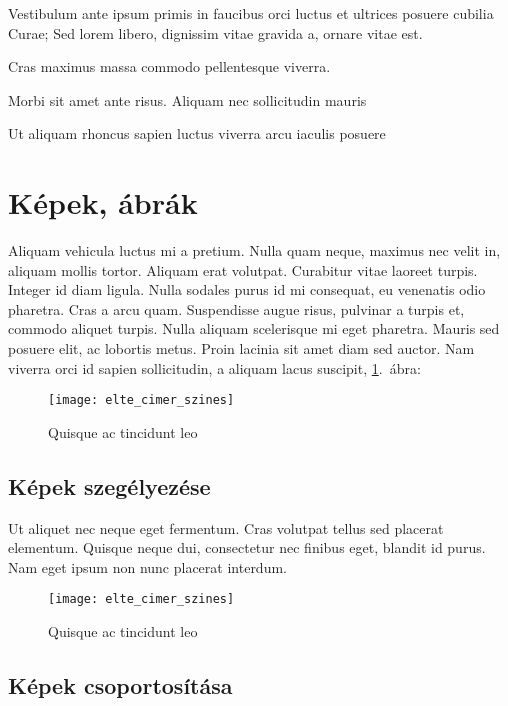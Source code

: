 \bigskip

Vestibulum ante ipsum primis in faucibus orci luctus et ultrices posuere cubilia Curae; Sed lorem libero, dignissim vitae gravida a, ornare vitae est.
\begin{compactdesc}
	\item[Cras maximus] massa commodo pellentesque viverra.
	\item[Morbi sit] amet ante risus. Aliquam nec sollicitudin mauris
	\item[Ut aliquam rhoncus sapien] luctus viverra arcu iaculis posuere
\end{compactdesc}


\section{Képek, ábrák}

Aliquam vehicula luctus mi a pretium. Nulla quam neque, maximus nec velit in, aliquam mollis tortor. Aliquam erat volutpat. Curabitur vitae laoreet turpis. Integer id diam ligula. Nulla sodales purus id mi consequat, eu venenatis odio pharetra. Cras a arcu quam. Suspendisse augue risus, pulvinar a turpis et, commodo aliquet turpis. Nulla aliquam scelerisque mi eget pharetra. Mauris sed posuere elit, ac lobortis metus. Proin lacinia sit amet diam sed auctor. Nam viverra orci id sapien sollicitudin, a aliquam lacus suscipit, \ref{fig:example-1}.~ábra:

\begin{figure}[H]
	\centering
	\texttt{[image: elte\_cimer\_szines]}
	\caption{Quisque ac tincidunt leo}
	\label{fig:example-1}
\end{figure}

\subsection{Képek szegélyezése}

Ut aliquet nec neque eget fermentum. Cras volutpat tellus sed placerat elementum. Quisque neque dui, consectetur nec finibus eget, blandit id purus. Nam eget ipsum non nunc placerat interdum.

\begin{figure}[H]
	\centering
	\texttt{[image: elte\_cimer\_szines]}
	\caption{Quisque ac tincidunt leo}
\end{figure}

\subsection{Képek csoportosítása}

